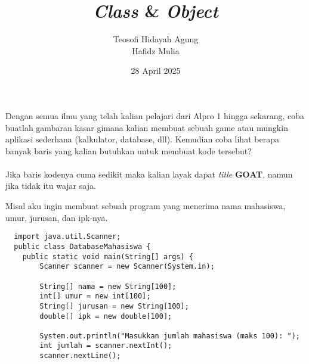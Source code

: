 \documentclass{../praktikum-ppt}
\author[Tew \& Haf]{Teosofi Hidayah Agung \\ Hafidz Mulia}
\date{28 April 2025}
\title[Alpro 2 - Week 5]{\textit{Class} \& \textit{Object}}
\institute[Matematika ITS]{Departemen Matematika\\ Institut Teknologi Sepuluh Nopember}
\begin{document}
{
\begin{frame}
  \titlepage
\end{frame}
}


  \begin{frame}
    \begin{masalah}
      Dengan semua ilmu yang telah kalian pelajari dari Alpro 1 hingga sekarang, coba buatlah gambaran kasar gimana kalian membuat sebuah game atau mungkin aplikasi sederhana (kalkulator, database, dll). Kemudian coba lihat berapa banyak baris yang kalian butuhkan untuk membuat kode tersebut?\\~\\

      Jika baris kodenya cuma sedikit maka kalian layak dapat \textit{title} \textbf{GOAT}, namun jika tidak itu wajar saja. 
    \end{masalah}
  \end{frame}

  \begin{frame}[fragile]
    \begin{contoh}
      Misal aku ingin membuat sebuah program yang menerima nama mahasiswa, umur, jurusan, dan ipk-nya.
    \end{contoh}
    \begin{lstlisting}
  import java.util.Scanner;
  public class DatabaseMahasiswa {
    public static void main(String[] args) {
        Scanner scanner = new Scanner(System.in);
        
        String[] nama = new String[100];
        int[] umur = new int[100];
        String[] jurusan = new String[100];
        double[] ipk = new double[100];

        System.out.println("Masukkan jumlah mahasiswa (maks 100): ");
        int jumlah = scanner.nextInt();
        scanner.nextLine();
    \end{lstlisting}
  \end{frame}
\end{document}
